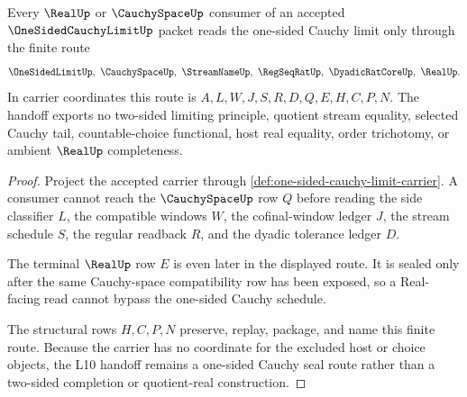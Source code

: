 \begin{theorem}\label{thm:one-sided-cauchy-limit-l10-seal-route}
Every $\RealUp$ or $\CauchySpaceUp$ consumer of an accepted $\OneSidedCauchyLimitUp$ packet reads the one-sided Cauchy limit only through the finite route
$$
\OneSidedLimitUp,\ \CauchySpaceUp,\ \StreamNameUp,\ \RegSeqRatUp,\ \DyadicRatCoreUp,\ \RealUp .
$$
In carrier coordinates this route is $A,L,W,J,S,R,D,Q,E,H,C,P,N$. The handoff exports no two-sided limiting principle, quotient stream equality, selected Cauchy tail, countable-choice functional, host real equality, order trichotomy, or ambient $\RealUp$ completeness.
\end{theorem}
\begin{proof}
Project the accepted carrier through \autoref{def:one-sided-cauchy-limit-carrier}. A consumer cannot reach the $\CauchySpaceUp$ row $Q$ before reading the side classifier $L$, the compatible windows $W$, the cofinal-window ledger $J$, the stream schedule $S$, the regular readback $R$, and the dyadic tolerance ledger $D$.

The terminal $\RealUp$ row $E$ is even later in the displayed route. It is sealed only after the same Cauchy-space compatibility row has been exposed, so a Real-facing read cannot bypass the one-sided Cauchy schedule.

The structural rows $H,C,P,N$ preserve, replay, package, and name this finite route. Because the carrier has no coordinate for the excluded host or choice objects, the L10 handoff remains a one-sided Cauchy seal route rather than a two-sided completion or quotient-real construction.
\end{proof}




